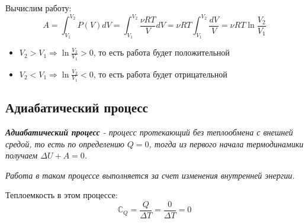 \documentclass[../main.tex]{subfiles}
\begin{document}
\begin{center}
\end{center}
Вычислим работу:
\[ A = \int_{V_1}^{V_2}P(V)dV = \int_{V_1}^{V_2}\frac{\nu R T}{V}dV = \nu RT \int_{V_1}^{V_2} \frac{dV}{V}  = \nu RT \ln{\frac{V_2}{V_1}}\]
\begin{itemize}
    \item $V_2 > V_1 \Rightarrow \ln{\frac{V_2}{V_1}} > 0$, то есть работа будет положительной
    \item $V_2 < V_1 \Rightarrow \ln{\frac{V_2}{V_1}} < 0$, то есть работа будет отрицательной
\end{itemize}

\subsection{Адиабатический процесс}
 \textit{\textbf{Адиабатический процесс} - процесс протекающий без теплообмена с внешней средой, то есть по определению $Q = 0$, тогда из первого начала термодинамики получаем $\Delta U + A = 0$. }

\textit{Работа в таком процессе выполняется за счет изменения внутренней энергии.}

\vspace{4px}

Теплоемкость в этом процессе: \[ \mathbb{C}_Q = \frac{Q}{\Delta T} = \frac{0}{\Delta T} = 0 \]
\end{document}
